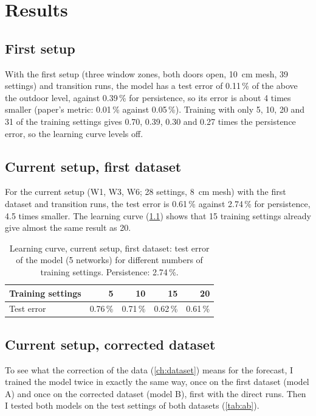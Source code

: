 \chapter{Results}
\label{ch:results}

\section{First setup}
With the first setup (three window zones, both doors open, 10~cm mesh, 39 settings) and transition runs, the
model has a test error of 0.11\,\% of the \cotwo{} above the outdoor level, against 0.39\,\% for persistence,
so its error is about 4 times smaller (paper's metric: 0.01\,\% against 0.05\,\%). Training with only 5, 10,
20 and 31 of the training settings gives 0.70, 0.39, 0.30 and 0.27 times the persistence error, so the
learning curve levels off. 

\section{Current setup, first dataset}
For the current setup (W1, W3, W6; 28 settings, 8~cm mesh) with the first dataset and transition runs, the
test error is 0.61\,\% against 2.74\,\% for persistence, 4.5 times smaller. The learning curve
(\cref{tab:lc}) shows that 15 training settings already give almost the same result as 20.

\begin{table}[h]
  \centering
  \caption{Learning curve, current setup, first dataset: test error of the model (5 networks) for different
  numbers of training settings. Persistence: 2.74\,\%.}
  \label{tab:lc}
  \begin{tabular}{lrrrr}
    \toprule
    Training settings & 5 & 10 & 15 & 20\\
    \midrule
    Test error & 0.76\,\% & 0.71\,\% & 0.62\,\% & 0.61\,\%\\
    \bottomrule
  \end{tabular}
\end{table}

\section{Current setup, corrected dataset}
To see what the correction of the data (\cref{ch:dataset}) means for the forecast, I trained the model twice
in exactly the same way, once on the first dataset (model A) and once on the corrected dataset (model B), first
with the direct runs. Then I tested both models on the test settings of both datasets (\cref{tab:ab}).

